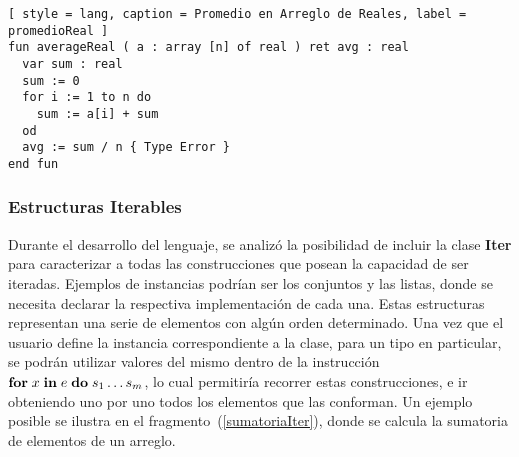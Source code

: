 \iffalse
Para flexibilizar el intérprete, podríamos implementar una \textit{coersión} implícita que convierta un número de tipo entero, a otro equivalente de tipo real, si fuese necesario.
De esta forma, obtendríamos la capacidad de emplear valores enteros en contextos donde se esperan números reales, como es el caso del ejemplo previo, donde deseamos dividir la sumatoria de valores en un arreglo de reales por su tamaño entero.
Otras situaciones que también se permitirían, comprenden la asignación de enteros a variables reales, o la llamada de funciones con parámetros del primer tipo cuando se esperaban del segundo.
Incluso podríamos ir un paso más adelante, y declarar a los números enteros como un \textit{subtipo} de los valores reales.
Esto implicaría una modificación estructural del actual sistema de tipos, donde deberíamos permitir situaciones más complejas que las contempladas anteriormente, como puede ser la de manipular un arreglo de enteros como si fuese un arreglo de reales.
La propiedad aún debe ser discutida y evaluada, ya que es necesario determinar su verdadera utilidad para el dictado de la materia.
\fi

\begin{lstlisting}[ style = lang, caption = Promedio en Arreglo de Reales, label = promedioReal ]
fun averageReal ( a : array [n] of real ) ret avg : real
  var sum : real
  sum := 0
  for i := 1 to n do
    sum := a[i] + sum
  od
  avg := sum / n { Type Error }
end fun
\end{lstlisting}

\subsubsection{Estructuras Iterables}

Durante el desarrollo del lenguaje, se analizó la posibilidad de incluir la clase \textbf{Iter} para caracterizar a todas las construcciones que posean la capacidad de ser iteradas.
Ejemplos de instancias podrían ser los conjuntos y las listas, donde se necesita declarar la respectiva implementación de cada una.
Estas estructuras representan una serie de elementos con algún orden determinado.
Una vez que el usuario define la instancia correspondiente a la clase, para un tipo en particular, se podrán utilizar valores del mismo dentro de la instrucción $\mathbf{for} \; x \; \mathbf{in} \; e \; \mathbf{do} \; s_{1} \ldots s_{m}$, lo cual permitiría recorrer estas construcciones, e ir obteniendo uno por uno todos los elementos que las conforman.
Un ejemplo posible se ilustra en el fragmento~(\ref{sumatoriaIter}), donde se calcula la sumatoria de elementos de un arreglo.

